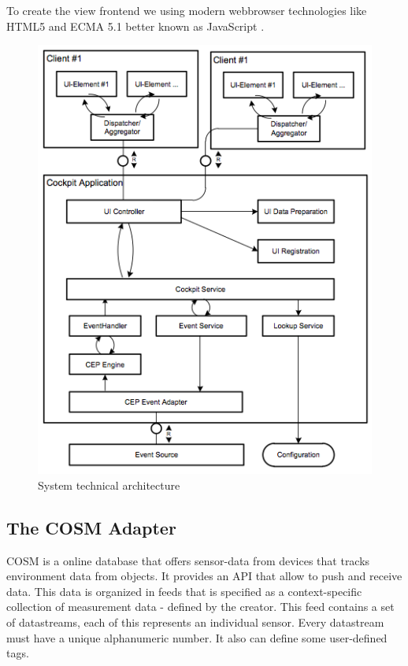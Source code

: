 \documentclass{acm_proc_article-sp}
\begin{document}
To create the view frontend we using modern webbrowser technologies like HTML5\cite{html5} and ECMA 5.1 better known as JavaScript \cite{ecma}.

\begin{figure}[h]
	\begin{center}
		\includegraphics[scale=0.5]{sta.png}
		\caption[System technical architecture]{System technical architecture}
		\label{fig:SystemTechnicalArchitecture}
	\end{center}
\end{figure}

\subsection{The COSM Adapter}
COSM is a online database that offers sensor-data from devices that tracks environment data from objects. It provides an API that allow to push and receive data.
This data is organized in feeds that is specified as a context-specific collection of measurement data - defined by the creator. This feed contains a set of datastreams, each of this represents an individual sensor. Every datastream must have a unique alphanumeric number. It also can define some user-defined tags.
\end{document}
